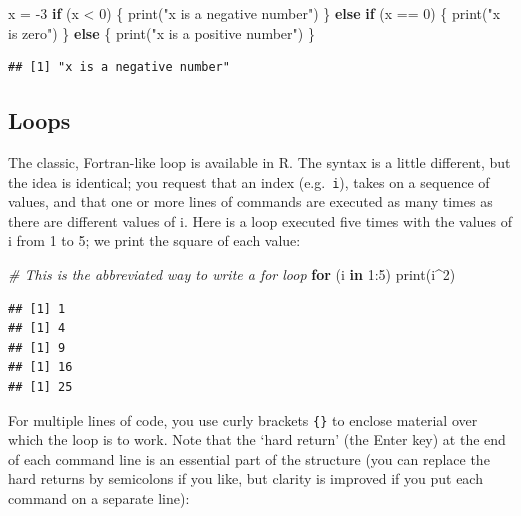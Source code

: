 \documentclass[
]{book}
\newenvironment{Shaded}{\begin{snugshade}}{\end{snugshade}}
\newcommand{\CommentTok}[1]{\textcolor[rgb]{0.56,0.35,0.01}{\textit{#1}}}
\newcommand{\ControlFlowTok}[1]{\textcolor[rgb]{0.13,0.29,0.53}{\textbf{#1}}}
\newcommand{\DecValTok}[1]{\textcolor[rgb]{0.00,0.00,0.81}{#1}}
\newcommand{\FunctionTok}[1]{\textcolor[rgb]{0.00,0.00,0.00}{#1}}
\newcommand{\NormalTok}[1]{#1}
\newcommand{\OtherTok}[1]{\textcolor[rgb]{0.56,0.35,0.01}{#1}}
\newcommand{\SpecialCharTok}[1]{\textcolor[rgb]{0.00,0.00,0.00}{#1}}
\newcommand{\StringTok}[1]{\textcolor[rgb]{0.31,0.60,0.02}{#1}}
\begin{document}
\begin{Shaded}
\begin{Highlighting}[]
\NormalTok{x }\OtherTok{=} \SpecialCharTok{{-}}\DecValTok{3}
\ControlFlowTok{if}\NormalTok{ (x }\SpecialCharTok{\textless{}} \DecValTok{0}\NormalTok{) \{}
  \FunctionTok{print}\NormalTok{(}\StringTok{"x is a negative number"}\NormalTok{)}
\NormalTok{\} }\ControlFlowTok{else} \ControlFlowTok{if}\NormalTok{ (x }\SpecialCharTok{==} \DecValTok{0}\NormalTok{) \{}
  \FunctionTok{print}\NormalTok{(}\StringTok{"x is zero"}\NormalTok{)}
\NormalTok{\} }\ControlFlowTok{else}\NormalTok{ \{}
  \FunctionTok{print}\NormalTok{(}\StringTok{"x is a positive number"}\NormalTok{)}
\NormalTok{\}}
\end{Highlighting}
\end{Shaded}

\begin{verbatim}
## [1] "x is a negative number"
\end{verbatim}

\hypertarget{loops}{%
\subsection{Loops}\label{loops}}

The classic, Fortran-like loop is available in R. The syntax is a little different, but the idea is identical; you request that an index (e.g.~\texttt{i}), takes on a sequence of values, and that one or more lines of commands are executed as many times as there are different values of i. Here is a loop executed five times with the values of i from 1 to 5; we print the square of each value:

\begin{Shaded}
\begin{Highlighting}[]
\CommentTok{\# This is the abbreviated way to write a for loop}
\ControlFlowTok{for}\NormalTok{ (i }\ControlFlowTok{in} \DecValTok{1}\SpecialCharTok{:}\DecValTok{5}\NormalTok{) }\FunctionTok{print}\NormalTok{(i}\SpecialCharTok{\^{}}\DecValTok{2}\NormalTok{)}
\end{Highlighting}
\end{Shaded}

\begin{verbatim}
## [1] 1
## [1] 4
## [1] 9
## [1] 16
## [1] 25
\end{verbatim}

For multiple lines of code, you use curly brackets \texttt{\{\}} to enclose material over which the loop is to work. Note that the `hard return' (the Enter key) at the end of each command line is an essential part of the structure (you can replace the hard returns by semicolons if you like, but clarity is improved if you put each command on a separate line):
\end{document}
